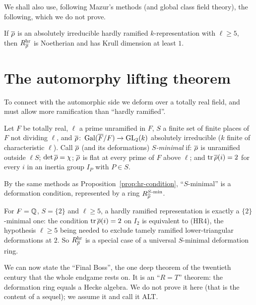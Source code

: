 \documentclass[11pt]{article}
\begin{document}
We shall also use, following Mazur's methods (and global class field theory),
the following, which we do not prove.

\begin{proposition}[assumed]\label{prop:krull}
If $\overline{\rho}$ is an absolutely irreducible hardly ramified $k$-representation
with $\ell\geq5$, then $R^{\mathrm{hr}}_{\overline{\rho}}$ is Noetherian and has Krull dimension
at least $1$.
\end{proposition}

\section{The automorphy lifting theorem}

To connect with the automorphic side we deform over a totally real field, and
must allow more ramification than ``hardly ramified''.

\begin{definition}\label{def:Smin}
Let $F$ be totally real, $\ell$ a prime unramified in $F$, $S$ a finite set of
finite places of $F$ not dividing $\ell$, and $\overline{\rho}\colon\operatorname{Gal}(\overline{F}/F)\to\operatorname{GL}_2(k)$
absolutely irreducible ($k$ finite of characteristic $\ell$). Call $\overline{\rho}$
(and its deformations) \emph{$S$-minimal} if: $\overline{\rho}$ is unramified outside
$\ell S$; $\det\overline{\rho}=\chi$; $\overline{\rho}$ is flat at every prime of $F$ above
$\ell$; and $\operatorname{tr}\overline{\rho}(i)=2$ for every $i$ in an inertia group $I_P$ with
$P\in S$.
\end{definition}

By the same methods as Proposition~\ref{prop:hr-condition}, ``$S$-minimal'' is a
deformation condition, represented by a ring $R^{S\text{-}\mathrm{min}}_{\overline{\rho}}$.

\begin{example}
For $F=\mathbb{Q}$, $S=\{2\}$ and $\ell\geq5$, a hardly ramified representation is
exactly a $\{2\}$-minimal one: the condition $\operatorname{tr}\overline{\rho}(i)=2$ on $I_2$ is
equivalent to (HR4), the hypothesis $\ell\geq5$ being needed to exclude
tamely ramified lower-triangular deformations at $2$. So $R^{\mathrm{hr}}_{\overline{\rho}}$ is
a special case of a universal $S$-minimal deformation ring.
\end{example}

We can now state the ``Final Boss'', the one deep theorem of the twentieth
century that the whole endgame rests on. It is an ``$R=T$'' theorem: the
deformation ring equals a Hecke algebra. We do not prove it here (that is the
content of a sequel); we assume it and call it \textup{ALT}.
\end{document}
